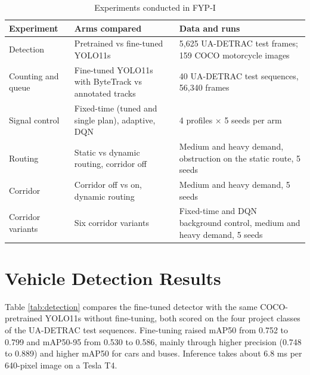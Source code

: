 \begin{table}[htbp]
\centering
\caption{Experiments conducted in FYP-I}
\label{tab:fyp1-experiments}
\begin{tabularx}{\textwidth}{p{}p{}Y}
\toprule
\textbf{Experiment} & \textbf{Arms compared} & \textbf{Data and runs}\\
\midrule
Detection & Pretrained vs fine-tuned YOLO11s & 5,625 UA-DETRAC test frames; 159 COCO motorcycle images\\
Counting and queue & Fine-tuned YOLO11s with ByteTrack vs annotated tracks & 40 UA-DETRAC test sequences, 56,340 frames\\
Signal control & Fixed-time (tuned and single plan), adaptive, DQN & 4 profiles $\times$ 5 seeds per arm\\
Routing & Static vs dynamic routing, corridor off & Medium and heavy demand, obstruction on the static route, 5 seeds\\
Corridor & Corridor off vs on, dynamic routing & Medium and heavy demand, 5 seeds\\
Corridor variants & Six corridor variants & Fixed-time and DQN background control, medium and heavy demand, 5 seeds\\
\bottomrule
\end{tabularx}
\end{table}

\section{Vehicle Detection Results}

Table \ref{tab:detection} compares the fine-tuned detector with the same COCO-pretrained YOLO11s without fine-tuning, both scored on the four project classes of the UA-DETRAC test sequences. Fine-tuning raised mAP50 from 0.752 to 0.799 and mAP50-95 from 0.530 to 0.586, mainly through higher precision (0.748 to 0.889) and higher mAP50 for cars and buses. Inference takes about 6.8 ms per 640-pixel image on a Tesla T4.

